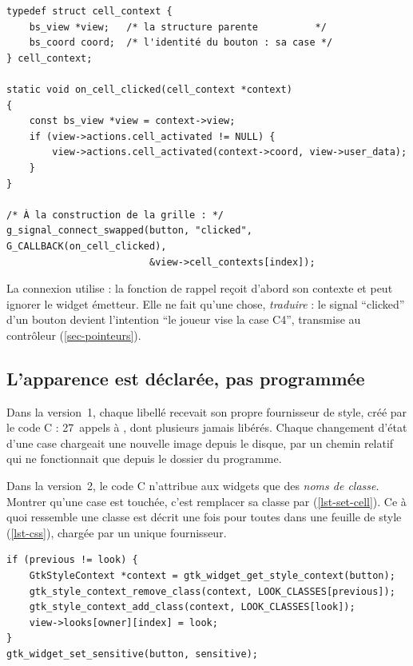 \begin{lstlisting}[caption={Contexte d'un bouton de case (\fichier{src/ui/view.c}).},
                   label={lst-contexte}]
typedef struct cell_context {
    bs_view *view;   /* la structure parente          */
    bs_coord coord;  /* l'identité du bouton : sa case */
} cell_context;

static void on_cell_clicked(cell_context *context)
{
    const bs_view *view = context->view;
    if (view->actions.cell_activated != NULL) {
        view->actions.cell_activated(context->coord, view->user_data);
    }
}

/* À la construction de la grille : */
g_signal_connect_swapped(button, "clicked", G_CALLBACK(on_cell_clicked),
                         &view->cell_contexts[index]);
\end{lstlisting}

La connexion utilise  : la fonction de rappel reçoit
d'abord son contexte et peut ignorer le widget émetteur. Elle ne fait qu'une chose,
\emph{traduire} : le signal \enquote{clicked} d'un bouton devient l'intention
\enquote{le joueur vise la case C4}, transmise au contrôleur (\cref{sec-pointeurs}).

\subsection{L'apparence est déclarée, pas programmée}

\begin{attention}
    Dans la version~1, chaque libellé recevait son propre fournisseur de style, créé par le
    code C : 27~appels à , dont plusieurs jamais libérés. Chaque
    changement d'état d'une case chargeait une nouvelle image depuis le disque, par un chemin
    relatif qui ne fonctionnait que depuis le dossier du programme.
\end{attention}

Dans la version~2, le code C n'attribue aux widgets que des \emph{noms de classe}. Montrer
qu'une case est touchée, c'est remplacer sa classe  par 
(\cref{lst-set-cell}). Ce à quoi ressemble une classe est décrit une fois pour toutes dans
une feuille de style (\cref{lst-css}), chargée par un unique fournisseur.

\begin{lstlisting}[caption={Mise à jour d'une case : un simple changement de classe.},
                   label={lst-set-cell}]
if (previous != look) {
    GtkStyleContext *context = gtk_widget_get_style_context(button);
    gtk_style_context_remove_class(context, LOOK_CLASSES[previous]);
    gtk_style_context_add_class(context, LOOK_CLASSES[look]);
    view->looks[owner][index] = look;
}
gtk_widget_set_sensitive(button, sensitive);
\end{lstlisting}

